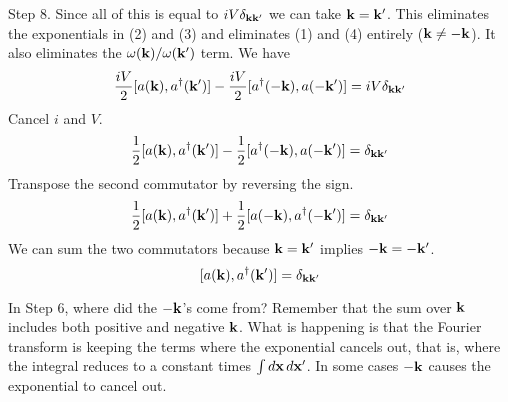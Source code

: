 %
Step 8.
Since all of this is equal to $iV\delta_{\bf kk^\prime}$ we can take
${\bf k}={\bf k'}$.
This eliminates the exponentials in (2) and (3) and
eliminates (1) and (4) entirely (${\bf k}\ne-{\bf k}$).
It also eliminates the
$\omega({\bf k})/\omega({\bf k^\prime})$ term. We have
%
$$
{iV\over2}[a({\bf k}),a^\dagger({\bf k^\prime})]
-{iV\over2}[a^\dagger(-{\bf k}),a(-{\bf k^\prime})]
=iV\delta_{\bf kk^\prime}
$$
%
Cancel $i$ and $V$.
%
$$
{1\over2}[a({\bf k}),a^\dagger({\bf k^\prime})]
-{1\over2}[a^\dagger(-{\bf k}),a(-{\bf k^\prime})]
=\delta_{\bf kk^\prime}
$$
%
Transpose the second commutator by reversing the sign.
%
$$
{1\over2}[a({\bf k}),a^\dagger({\bf k^\prime})]
+{1\over2}[a(-{\bf k}),a^\dagger(-{\bf k^\prime})]
=\delta_{\bf kk^\prime}
$$
%
We can sum the two commutators because ${\bf k}={\bf k^\prime}$ implies
$-{\bf k}=-{\bf k^\prime}$.
%
$$
[a({\bf k}),a^\dagger({\bf k^\prime})]=\delta_{\bf kk^\prime}
$$

\vfill
\break


In Step 6, where did the $-\bf k$'s come from?
Remember that the sum over $\bf k$ includes both positive and negative $\bf k$.
What is happening is that the Fourier transform is keeping the terms where the
exponential cancels out, that is, where the integral reduces to a constant
times $\int d{\bf x}\,d{\bf x^\prime}$.
In some cases $-\bf k$ causes the exponential to cancel out.

\vfill
\break


